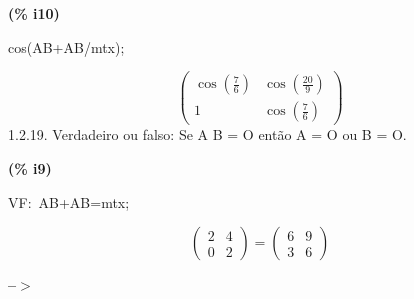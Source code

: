 \documentclass[fleqn]{article}
\begin{document}
\noindent
\begin{minipage}[t]{4.000000em}\color{red}\bfseries
(\% i10)	
\end{minipage}
\begin{minipage}[t]{\textwidth}\color{blue}
cos(AB+AB/mtx);
\end{minipage}
\[\displaystyle \tag{\% o10} 
\begin{pmatrix}\cos{\left( \frac{7}{6}\right) } & \cos{\left( \frac{20}{9}\right) }\\
1 & \cos{\left( \frac{7}{6}\right) }\end{pmatrix}\mbox{}
\]
1.2.19. Verdadeiro ou falso: Se A B = O então A = O ou B = O.


\noindent
\begin{minipage}[t]{4.000000em}\color{red}\bfseries
(\% i9)	
\end{minipage}
\begin{minipage}[t]{\textwidth}\color{blue}
VF:\ AB+AB=mtx;\ 
\end{minipage}
\[\displaystyle \tag{VF} 
\begin{pmatrix}2 & 4\\
0 & 2\end{pmatrix}\mathop{=}\begin{pmatrix}6 & 9\\
3 & 6\end{pmatrix}\mbox{}
\]


\noindent
\begin{minipage}[t]{4.000000em}\color{red}\bfseries
 --\ensuremath{\ensuremath{>}}	
\end{minipage}
\begin{minipage}[t]{\textwidth}\color{blue}

\end{minipage}

\noindent%
\end{document}
